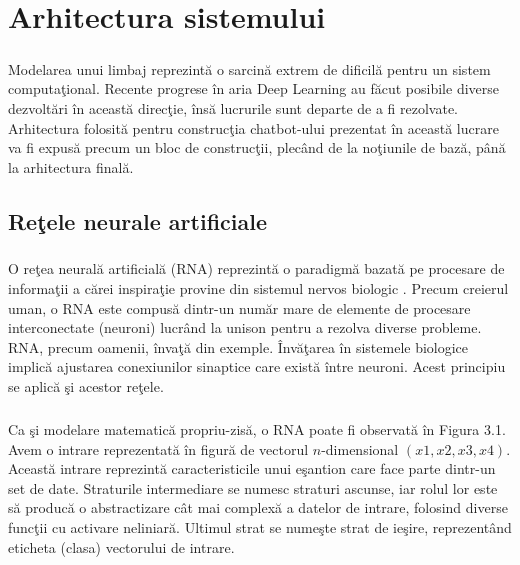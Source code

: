 \chapter{Arhitectura sistemului}

\paragraph{}
Modelarea unui limbaj reprezint\u a o sarcin\u a extrem de dificil\u a pentru un sistem computa\c tional. Recente progrese \^ in aria Deep Learning au f\u acut posibile diverse dezvolt\u ari \^ in aceast\u a direc\c tie, \^ ins\u a lucrurile sunt departe de a fi rezolvate. Arhitectura folosit\u a pentru construc\c tia chatbot-ului prezentat \^ in aceast\u a lucrare va fi expus\u a precum un bloc de construc\c tii, plec\^ and de la no\c tiunile de baz\u a, p\^ an\u a la arhitectura final\u a.

\section{Re\c tele neurale artificiale}

\paragraph{}
O re\c tea neural\u a artificial\u a (RNA) reprezint\u a o paradigm\u a bazat\u a pe procesare de informa\c tii a c\u arei inspira\c tie provine din sistemul nervos biologic \cite{biological-inpiration}. Precum creierul uman, o RNA este compus\u a dintr-un num\u ar mare de elemente de procesare interconectate (neuroni) lucr\^ and la unison pentru a rezolva diverse probleme. RNA, precum oamenii, \^ inva\c t\u a din exemple. \^ Inv\u a\c tarea \^ in sistemele biologice implic\u a ajustarea conexiunilor sinaptice care exist\u a \^ intre neuroni. Acest principiu se aplic\u a \c si acestor re\c tele.

\paragraph{}
Ca \c si modelare matematic\u a propriu-zis\u a, o RNA poate fi observat\u a \^ in Figura 3.1. Avem o intrare reprezentat\u a \^ in figur\u a de vectorul \(n\)-dimensional \((x1, x2, x3, x4)\). Aceast\u a intrare reprezint\u a caracteristicile unui e\c santion care face parte dintr-un set de date. Straturile intermediare se numesc straturi ascunse, iar rolul lor este s\u a produc\u a o abstractizare c\^ at mai complex\u a a datelor de intrare, folosind diverse func\c tii cu activare neliniar\u a. Ultimul strat se nume\c ste strat de ie\c sire, reprezent\^ and eticheta (clasa) vectorului de intrare.

